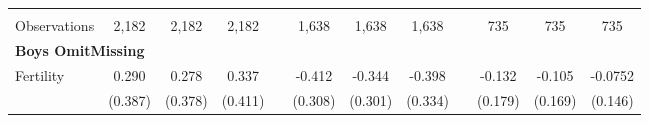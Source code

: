 \begin{landscape}
\begin{table}[htpb!]
\begin{center}
\begin{tabular}{lcccp{2mm}cccp{2mm}ccc}
\begin{footnotesize}\end{footnotesize}&\begin{footnotesize}\end{footnotesize}&\begin{footnotesize}\end{footnotesize}&\begin{footnotesize}\end{footnotesize}&\begin{footnotesize}\end{footnotesize}&\begin{footnotesize}\end{footnotesize}&\begin{footnotesize}\end{footnotesize}&\begin{footnotesize}\end{footnotesize}&\begin{footnotesize}\end{footnotesize}&\begin{footnotesize}\end{footnotesize}&\begin{footnotesize}\end{footnotesize}&\begin{footnotesize}\end{footnotesize}\\Observations&2,182&2,182&2,182&&1,638&1,638&1,638&&735&735&735\\
\multicolumn{12}{l}{\textbf{Boys OmitMissing}}\\ 
Fertility&0.290&0.278&0.337&&-0.412&-0.344&-0.398&&-0.132&-0.105&-0.0752\\
&(0.387)&(0.378)&(0.411)&&(0.308)&(0.301)&(0.334)&&(0.179)&(0.169)&(0.146)\\

\end{tabular}
\end{center}
\end{table}
\end{landscape}
